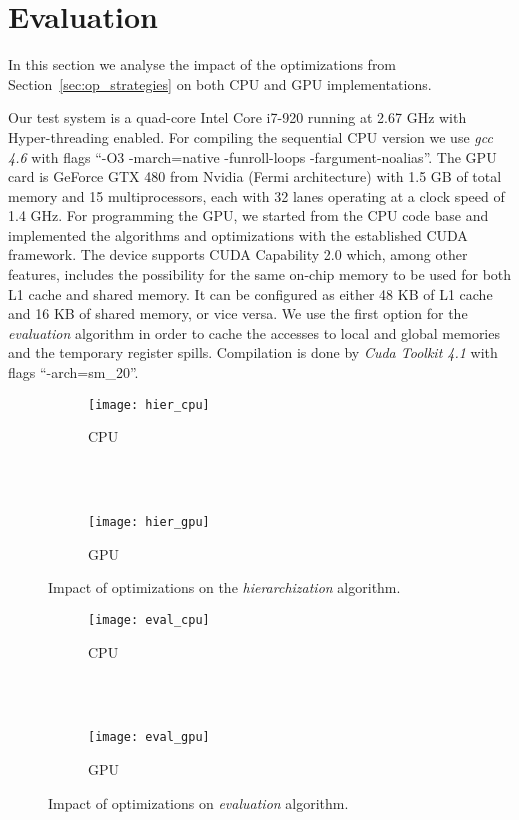 \section{Evaluation}
\label{sec:evaluation}

In this section we analyse the impact of the optimizations from
Section~\ref{sec:op_strategies} on both CPU and GPU implementations.

Our test system is a quad-core Intel Core i7-920 running at 2.67 GHz with
Hyper-threading enabled. For compiling the sequential CPU version we use
\textit{gcc 4.6} with flags ``-O3 -march=native -funroll-loops
-fargument-noalias''. The GPU card is GeForce GTX 480 from Nvidia (Fermi
architecture) with 1.5 GB of total memory and 15 multiprocessors, each with 32
lanes operating at a clock speed of 1.4 GHz. For programming the GPU, we started
from the CPU code base and implemented the algorithms and optimizations with the
established CUDA framework. The device supports CUDA Capability 2.0 which, among
other features, includes the possibility for the same on-chip memory to be used
for both L1 cache and shared memory. It can be configured as either 48 KB of L1
cache and 16 KB of shared memory, or vice versa. We use the first option for the
\textit{evaluation} algorithm in order to cache the accesses to local and global
memories and the temporary register spills. Compilation is done by \textit{Cuda
Toolkit 4.1} with flags ``-arch=sm\_20''.

\begin{figure}[t]
  \begin{subfigure}[t]{1\linewidth}
    \centering
    \texttt{[image: hier\_cpu]} \\
    \caption{CPU}
  \end{subfigure}
  \\ \\
  \begin{subfigure}[t]{1\linewidth}
    \centering
    \texttt{[image: hier\_gpu]}
    \caption{GPU}
  \end{subfigure}
  \caption{Impact of optimizations on the \textit{hierarchization} algorithm.}
  \label{fig:hier_results}
\end{figure}

\begin{figure}[t]
  \begin{subfigure}[t]{1\linewidth}
    \centering
    \texttt{[image: eval\_cpu]} \\
    \caption{CPU}
  \end{subfigure}
  \\ \\
  \begin{subfigure}[t]{1\linewidth}
    \centering
    \texttt{[image: eval\_gpu]}
    \caption{GPU}
  \end{subfigure}
  \caption{Impact of optimizations on \textit{evaluation} algorithm.}
  \label{fig:eval_results}
\end{figure}

